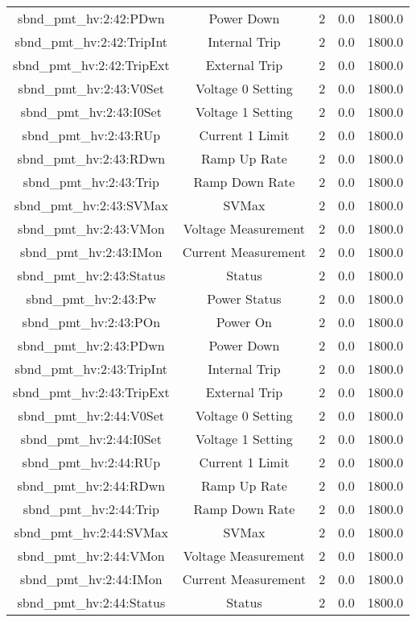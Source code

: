 \begin{table}[ptb]
\begin{tabular}{c | c c c c}
sbnd_pmt_hv:2:42:PDwn & Power Down & 2 & 0.0 & 1800.0\\ 
sbnd_pmt_hv:2:42:TripInt & Internal Trip & 2 & 0.0 & 1800.0\\ 
sbnd_pmt_hv:2:42:TripExt & External Trip & 2 & 0.0 & 1800.0\\ 
sbnd_pmt_hv:2:43:V0Set & Voltage 0 Setting & 2 & 0.0 & 1800.0\\ 
sbnd_pmt_hv:2:43:I0Set & Voltage 1 Setting & 2 & 0.0 & 1800.0\\ 
sbnd_pmt_hv:2:43:RUp & Current 1 Limit & 2 & 0.0 & 1800.0\\ 
sbnd_pmt_hv:2:43:RDwn & Ramp Up Rate & 2 & 0.0 & 1800.0\\ 
sbnd_pmt_hv:2:43:Trip & Ramp Down Rate & 2 & 0.0 & 1800.0\\ 
sbnd_pmt_hv:2:43:SVMax & SVMax & 2 & 0.0 & 1800.0\\ 
sbnd_pmt_hv:2:43:VMon & Voltage Measurement & 2 & 0.0 & 1800.0\\ 
sbnd_pmt_hv:2:43:IMon & Current Measurement & 2 & 0.0 & 1800.0\\ 
sbnd_pmt_hv:2:43:Status & Status & 2 & 0.0 & 1800.0\\ 
sbnd_pmt_hv:2:43:Pw & Power Status & 2 & 0.0 & 1800.0\\ 
sbnd_pmt_hv:2:43:POn & Power On & 2 & 0.0 & 1800.0\\ 
sbnd_pmt_hv:2:43:PDwn & Power Down & 2 & 0.0 & 1800.0\\ 
sbnd_pmt_hv:2:43:TripInt & Internal Trip & 2 & 0.0 & 1800.0\\ 
sbnd_pmt_hv:2:43:TripExt & External Trip & 2 & 0.0 & 1800.0\\ 
sbnd_pmt_hv:2:44:V0Set & Voltage 0 Setting & 2 & 0.0 & 1800.0\\ 
sbnd_pmt_hv:2:44:I0Set & Voltage 1 Setting & 2 & 0.0 & 1800.0\\ 
sbnd_pmt_hv:2:44:RUp & Current 1 Limit & 2 & 0.0 & 1800.0\\ 
sbnd_pmt_hv:2:44:RDwn & Ramp Up Rate & 2 & 0.0 & 1800.0\\ 
sbnd_pmt_hv:2:44:Trip & Ramp Down Rate & 2 & 0.0 & 1800.0\\ 
sbnd_pmt_hv:2:44:SVMax & SVMax & 2 & 0.0 & 1800.0\\ 
sbnd_pmt_hv:2:44:VMon & Voltage Measurement & 2 & 0.0 & 1800.0\\ 
sbnd_pmt_hv:2:44:IMon & Current Measurement & 2 & 0.0 & 1800.0\\ 
sbnd_pmt_hv:2:44:Status & Status & 2 & 0.0 & 1800.0\\ 

\end{tabular}
\end{table}
